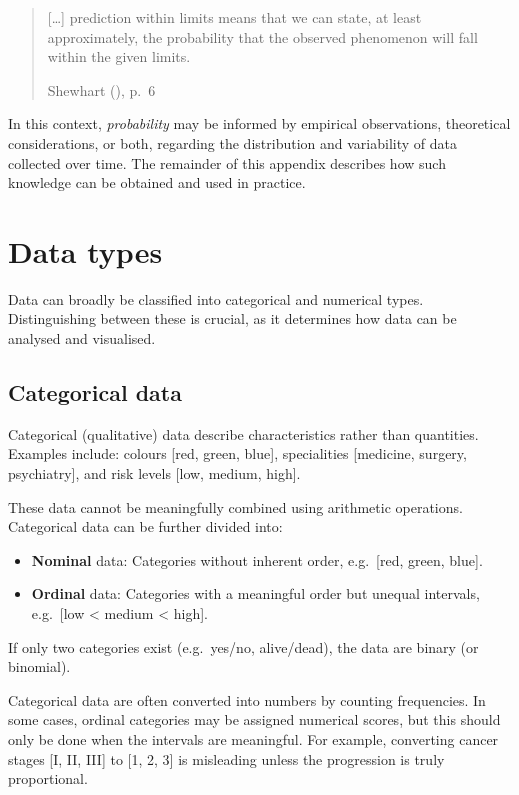 \documentclass[
]{book}
\providecommand{\tightlist}{%
  \setlength{\itemsep}{0pt}\setlength{\parskip}{0pt}}
\begin{document}
\begin{quote}
{[}\ldots{]} prediction within limits means that we can state, at least approximately, the probability that the observed phenomenon will fall within the given limits.

Shewhart (), p.~6
\end{quote}

In this context, \emph{probability} may be informed by empirical observations, theoretical considerations, or both, regarding the distribution and variability of data collected over time. The remainder of this appendix describes how such knowledge can be obtained and used in practice.

\section{Data types}\label{data-types}

Data can broadly be classified into categorical and numerical types. Distinguishing between these is crucial, as it determines how data can be analysed and visualised.

\subsection{Categorical data}\label{categorical-data}

Categorical (qualitative) data describe characteristics rather than quantities. Examples include: colours {[}red, green, blue{]}, specialities {[}medicine, surgery, psychiatry{]}, and risk levels {[}low, medium, high{]}.

These data cannot be meaningfully combined using arithmetic operations. Categorical data can be further divided into:

\begin{itemize}
\tightlist
\item
  \textbf{Nominal} data: Categories without inherent order, e.g.~{[}red, green, blue{]}.
\item
  \textbf{Ordinal} data: Categories with a meaningful order but unequal intervals, e.g.~{[}low \textless{} medium \textless{} high{]}.
\end{itemize}

If only two categories exist (e.g.~yes/no, alive/dead), the data are binary (or binomial).

Categorical data are often converted into numbers by counting frequencies. In some cases, ordinal categories may be assigned numerical scores, but this should only be done when the intervals are meaningful. For example, converting cancer stages {[}I, II, III{]} to {[}\hspace{0pt}1, 2, 3{]} is misleading unless the progression is truly proportional.
\end{document}
